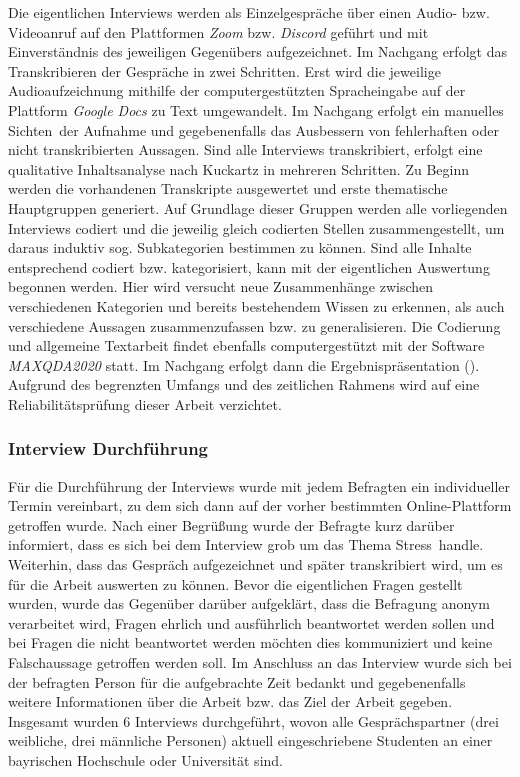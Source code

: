 \documentclass[10pt]{article}
\newcommand{\zit}[1]{(\cite{#1})}
\begin{document}
Die eigentlichen Interviews werden als Einzelgespräche über einen Audio- bzw. Videoanruf auf den Plattformen \textit{Zoom} bzw. \textit{Discord} geführt und mit Einverständnis des jeweiligen Gegenübers aufgezeichnet. 
Im Nachgang erfolgt das Transkribieren der Gespräche in zwei Schritten. Erst wird die jeweilige Audioaufzeichnung mithilfe der computergestützten Spracheingabe auf der Plattform \textit{Google Docs} zu Text umgewandelt. Im Nachgang erfolgt ein manuelles \grqq Sichten\grqq\ der Aufnahme und gegebenenfalls das Ausbessern von fehlerhaften oder nicht transkribierten Aussagen. 
Sind alle Interviews transkribiert, erfolgt eine qualitative Inhaltsanalyse nach Kuckartz in mehreren Schritten. Zu Beginn werden die vorhandenen Transkripte ausgewertet und erste thematische Hauptgruppen generiert. Auf Grundlage dieser Gruppen werden alle vorliegenden Interviews codiert und die jeweilig gleich codierten Stellen zusammengestellt, um daraus induktiv sog. Subkategorien bestimmen zu können. Sind alle Inhalte entsprechend codiert bzw. kategorisiert, kann mit der eigentlichen Auswertung begonnen werden. Hier wird versucht neue Zusammenhänge zwischen verschiedenen Kategorien und bereits bestehendem Wissen zu erkennen, als auch verschiedene Aussagen zusammenzufassen bzw. zu generalisieren. Die Codierung und allgemeine Textarbeit findet ebenfalls computergestützt mit der Software \textit{MAXQDA2020} statt. Im Nachgang erfolgt dann die Ergebnispräsentation \zit{Inhaltsanalyse}. Aufgrund des begrenzten Umfangs und des zeitlichen Rahmens wird auf eine Reliabilitätsprüfung dieser Arbeit verzichtet.

\subsubsection{Interview Durchführung}
Für die Durchführung der Interviews wurde mit jedem Befragten ein individueller Termin vereinbart, zu dem sich dann auf der vorher bestimmten Online-Plattform getroffen wurde. Nach einer Begrüßung wurde der Befragte kurz darüber informiert, dass es sich bei dem Interview grob um das Thema  \grqq Stress\grqq\ handle. Weiterhin, dass das Gespräch aufgezeichnet und später transkribiert wird, um es für die Arbeit auswerten zu können. Bevor die eigentlichen Fragen gestellt wurden, wurde das Gegenüber darüber aufgeklärt, dass die Befragung anonym verarbeitet wird, Fragen ehrlich und ausführlich beantwortet werden sollen und bei Fragen die nicht beantwortet werden möchten dies kommuniziert und keine Falschaussage getroffen werden soll. Im Anschluss an das Interview wurde sich bei der befragten Person für die aufgebrachte Zeit bedankt und gegebenenfalls weitere Informationen über die Arbeit bzw. das Ziel der Arbeit gegeben.
Insgesamt wurden 6 Interviews durchgeführt, wovon alle Gesprächspartner (drei weibliche, drei männliche Personen) aktuell eingeschriebene Studenten an einer bayrischen Hochschule oder Universität sind. 
\end{document}
